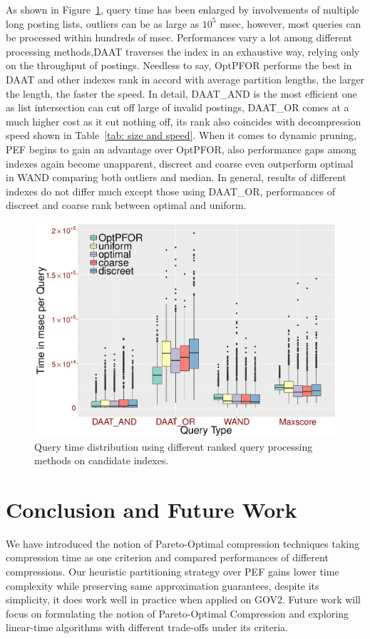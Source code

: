 \documentclass[runningheads,a4paper]{llncs}
\begin{document}
As shown in Figure~\ref{fig:queries}, query time has been enlarged by involvements of multiple long posting lists, outliers can be as large as $10^{5}$ msec, however, most queries can be processed within hundreds of msec. Performances vary a lot among different processing methods,DAAT traverses the index in an exhaustive way, relying only on the throughput of postings. Needless to say, OptPFOR performs the best in DAAT and other indexes rank in accord with average partition lengths, the larger the length, the faster the speed. In detail, DAAT\_AND is the most efficient one as list intersection can cut off large of invalid postings, DAAT\_OR comes at a much higher cost as it cut nothing off, its rank also coincides with decompression speed shown in Table~\ref{tab: size and speed}. When it comes to dynamic pruning, PEF begins to gain an advantage over OptPFOR, also performance gaps among indexes again become unapparent, discreet and coarse even outperform optimal in WAND comparing both outliers and median. In general, results of different indexes do not differ much except those using DAAT\_OR, performances of discreet and coarse rank between optimal and uniform.

\begin{figure}
	\centering
	\includegraphics[width=0.7\linewidth]{queries}
	\caption{Query time distribution using different ranked query processing methods on candidate indexes.}
	\label{fig:queries}
\end{figure}

\section{Conclusion and Future Work}\label{sec:conclusion}

We have introduced the notion of Pareto-Optimal compression techniques taking compression time as one criterion and compared performances of different compressions. Our heuristic partitioning strategy over PEF gains lower time complexity while preserving same approximation guarantees,
despite its simplicity, it does work well in practice when applied on GOV2.
Future work will focus on formulating the notion of Pareto-Optimal Compression and exploring linear-time algorithms with different trade-offs under its criteria.
\end{document}
